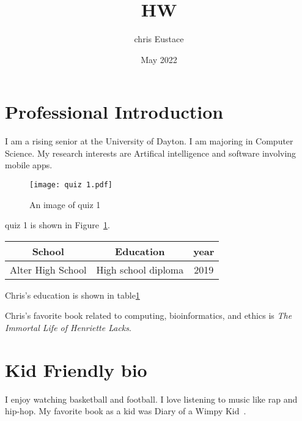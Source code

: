 \documentclass{article}
\title{HW}
\author{chris Eustace }
\date{May 2022}
\begin{document}
\section{Professional Introduction}
I am a rising senior at the University of Dayton. I am majoring in Computer Science. My research interests are Artifical intelligence and software involving mobile apps.


\begin{figure}[h]
\caption{An image of quiz 1}
\centering
\texttt{[image: quiz 1.pdf]}
\label{fig:katie}
\end{figure}

quiz 1 is shown in  Figure~\ref{fig:katie}.
\begin{table}[h]
\begin{tabular}{c|c|c}
    School & Education & year \\\hline 
    Alter High School & High school diploma & 2019 


    \end{tabular}
    \label{tab:chrisEd}
    \end{table}
Chris's education is shown in table\ref{tab:chrisEd}


Chris's favorite book related to computing, bioinformatics, and ethics is \emph{The Immortal Life of Henriette Lacks}\cite{ImmortalLife}.

\section{Kid Friendly bio}
I enjoy watching basketball and football. I love listening to music like rap and hip-hop. My favorite book as a kid was Diary of a Wimpy Kid~\cite{DiaryWimpyKid}.



\end{document}
